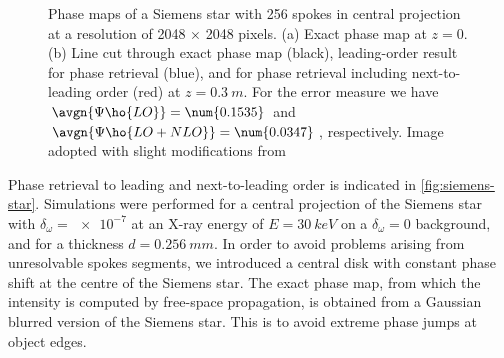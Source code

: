 \documentclass[
twoside,
openright,
titlepage,
numbers=noenddot,
headinclude,
fleqn,
a4paper,
footinclude=true,
cleardoublepage=empty,
abstractoff,
BCOR=5mm,
paper=a4,
fontsize=11pt,
british,ngerman,american,
]{scrreprt}
\begin{document}
\begin{figure}
  \centering
  \caption[Leading-order phase retrieval and next-to-leading-order
  correction from propagated intensity of a modified Siemens-star
  phase object.]{%
    Phase maps of a Siemens star with 256 spokes in central projection
    at a resolution of 2048 $\times$ 2048 pixels.  (a) Exact phase map
    at $z=0$.  (b) Line cut through exact phase map (black),
    leading-order result for phase retrieval (blue), and for phase
    retrieval including next-to-leading order (red) at
    $z=\SI{0.3}{m}$.  For the error measure we have
    $\avgn{\Psi\ho{LO}}=\num{0.1535}$ and
    $\avgn{\Psi\ho{LO+NLO}}=\num{0.0347}$, respectively.  Image
    adopted with slight modifications from \cite{Moosmann2010opex}}
    \label{fig:siemens-star-thick}
\end{figure}
Phase retrieval to leading and next-to-leading order is indicated in
\cref{fig:siemens-star}.  Simulations were performed for a central
projection of the Siemens star with $\delta_\omega=\num{e-7}$ at an
X-ray energy of $E=\SI{30}{keV}$ on a $\delta_\omega=0$ background,
and for a thickness $d=\SI{0.256}{mm}$.  In order to avoid problems
arising from unresolvable spokes segments, we introduced a central
disk with constant phase shift at the centre of the Siemens star.  The
exact phase map, from which the intensity is computed by free-space
propagation, is obtained from a Gaussian blurred version of the
Siemens star.  This is to avoid extreme phase jumps at object edges.
\end{document}
